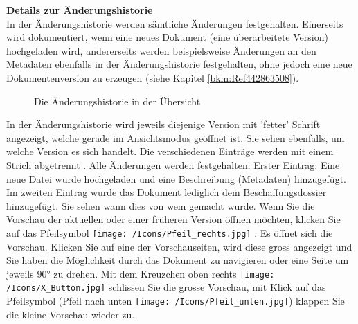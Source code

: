 \vspace{\baselineskip}

\textbf{Details zur Änderungshistorie} \\
In der Änderungshistorie werden sämtliche Änderungen festgehalten. Einerseits wird dokumentiert, wenn eine neues Dokument (eine überarbeitete Version) hochgeladen wird, andererseits werden beispielsweise Änderungen an den Metadaten ebenfalls in der Änderungshistorie festgehalten, ohne jedoch eine neue Dokumentenversion zu erzeugen (siehe Kapitel \ref{bkm:Ref442863508}).

\begin{figure}[H]
\caption{Die Änderungshistorie in der Übersicht}
\end{figure}

 In der Änderungshistorie wird jeweils diejenige Version mit 'fetter' Schrift angezeigt, welche gerade im Ansichtsmodus geöffnet ist. Sie sehen ebenfalls, um welche Version es sich handelt. Die verschiedenen Einträge werden mit einem Strich abgetrennt . Alle Änderungen werden festgehalten: Erster Eintrag: Eine neue Datei wurde hochgeladen und eine Beschreibung (Metadaten) hinzugefügt. Im zweiten Eintrag wurde das Dokument lediglich dem Beschaffungsdossier hinzugefügt. Sie sehen wann dies von wem gemacht wurde. Wenn Sie die Vorschau der aktuellen oder einer früheren Version öffnen möchten, klicken Sie auf das Pfeilsymbol \texttt{[image: /Icons/Pfeil\_rechts.jpg]} . Es öffnet sich die Vorschau. Klicken Sie auf eine der Vorschauseiten, wird diese gross angezeigt und Sie haben die Möglichkeit durch das Dokument zu navigieren oder eine Seite um jeweils 90° zu drehen. Mit dem Kreuzchen oben rechts \texttt{[image: /Icons/X\_Button.jpg]} schlissen Sie die grosse Vorschau, mit Klick auf das Pfeilsymbol (Pfeil nach unten \texttt{[image: /Icons/Pfeil\_unten.jpg]}) klappen Sie die kleine Vorschau wieder zu.

